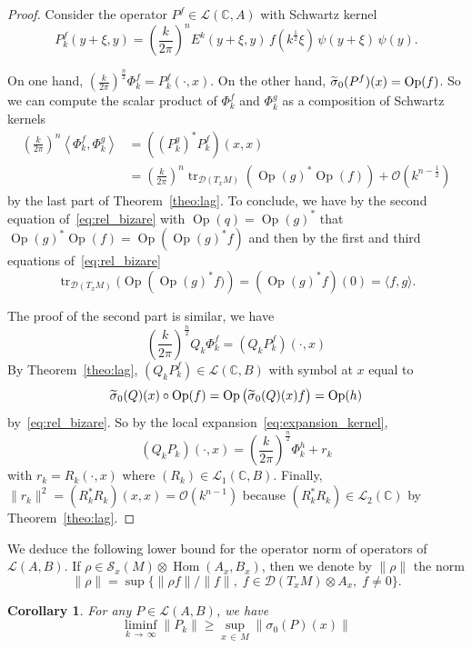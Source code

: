 \documentclass[10pt,a4paper]{article}
\newtheorem{coro}[theo]{Corollary}
\theoremstyle{definition}
\numberwithin{equation}{section}
\newcommand{\C}{{\mathbb{C}}}
\newcommand{\si}{{\sigma}}
\newcommand{\op}{\operatorname}
\newcommand{\bigo}{\mathcal{O}}
\newcommand{\D}{\mathcal{D}}
\newcommand{\symb}{\mathcal{S}}
\newcommand{\lag}{\mathcal{L}}
\let\oldtilde\tilde
\renewcommand*{\tilde}[1]{\mathchoice{\widetilde{#1}}{\widetilde{#1}}{\oldtilde{#1}}{\oldtilde{#1}}}
\begin{document}
\begin{proof}
Consider the operator $P^f \in \lag (\C, A)$ with Schwartz
kernel 
\[
P^f_k (y+ \xi, y) = \left(\frac{k}{2\pi} \right)^n E^k (y+ \xi, y) \, f 
\left(k^{\frac{1}{2}} \xi\right)\, \psi (y+ \xi) \, \psi (y).
\]

On one hand, $(\frac{k}{2\pi})^{\frac{n}{2}} \Phi^f_k = P_k^f (\cdot,x)$. On the other hand, $\tilde{\si}_0(P^f)(x) = \op{Op} (f)$. So we can compute the scalar product of $\Phi^f_k$ and $\Phi^g_k$ as a composition of Schwartz kernels
\begin{align*}
\left (\frac{k}{2\pi} \right)^n \left\langle \Phi_k^f, \Phi_k^g \right\rangle & = \left(\left(P_k^g\right)^* P_k^f\right)(x,x) \\
& = \left(\frac{k}{2\pi} \right)^n \op{tr}_{\D (T_xM)} (\op{Op} (g)^*
\op{Op} (f)) + \bigo \left(k^{n-\frac{1}{2}}\right)
\end{align*}
by the last part of Theorem~\ref{theo:lag}.  To conclude, we have by the second equation of~\eqref{eq:rel_bizare} with $\op{Op} (q) = \op{Op} (g)^*$ that $ \op{Op} (g)^* \op{Op} (f) = \op{Op} (\op{Op} (g)^* f) $ and then by the first and third equations of~\eqref{eq:rel_bizare}
\[
\op{tr}_{\D \left(T_xM\right)} (\op{Op} \left(\op{Op} (g)^* f)\right) = \left(\op{Op} (g)^* f\right)(0)
= \langle f, g \rangle.
\]

The proof of the second part is similar, we have
\[
\left(\frac{k}{2\pi} \right)^{\frac{n}{2}} Q_k \Phi^f_k = \left(Q_k
P_k^f\right)(\cdot, x)
\]
By Theorem~\ref{theo:lag}, $(Q_k P_k^f) \in \lag (\C,B)$ with symbol at $x$
equal to
\[
\tilde{\si}_0 (Q) (x) \circ \op{Op} (f)
= \op{Op} \big(\tilde{\si}_0 (Q) (x) f\big) = \op{Op} (h)
\]
by~\eqref{eq:rel_bizare}.  So by the local expansion~\eqref{eq:expansion_kernel},
\[
\left(Q_k P_k\right)(\cdot,x) = \left(\frac{k}{2\pi} \right)^{\frac{n}{2}} \Phi_k^h + r_k
\]
with $r_k =R_{k} (\cdot, x)$ where $(R_{k}) \in \lag_ 1 (\C,B)$. Finally, $\| r_k \|^2 = (R_k^* R_k) (x,x) = \bigo (k^{n-1})$ because $(R_k^*R_k) \in
\lag_2 (\C)$ by Theorem~\ref{theo:lag}. 
\end{proof}

We deduce the following lower bound for the operator norm of operators of $\lag (A,B)$. If $\rho \in \symb_x (M) \otimes \op{Hom} (A_x, B_x)$, then we denote by $\| \rho \|$ the norm
\[
\| \rho \| = \sup \bigl\{ \| \rho f \| / \| f \|,\; f \in \D (T_xM)
\otimes A_x, \; f \neq 0 \bigr\}.
\]


\begin{coro} \label{cor:norm_estim}
For any $P \in \lag (A,B)$, we have
\[
\liminf_{k\,\rightarrow\,\infty} \| P_k \| \geqslant \sup_{x\,\in\,M} \|
\si_0 (P)(x) \|
\]
\end{coro}
\end{document}
